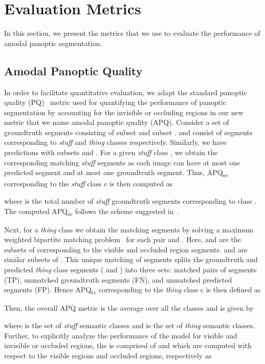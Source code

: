 \documentclass[10pt,twocolumn,letterpaper]{article}
\begin{document}
\section{Evaluation Metrics}
In this section, we present the metrics that we use to evaluate the performance of amodal panoptic segmentation. 

\subsection{Amodal Panoptic Quality}

In order to facilitate quantitative evaluation, we adapt the standard panoptic quality (PQ)~\cite{kirillov2019panoptic} metric used for quantifying the performance of panoptic segmentation by accounting for the invisible or occluding regions in our new metric that we name amodal panoptic quality (APQ). Consider a set of groundtruth segments consisting of subset  and subset .  and  consist of segments corresponding to \textit{stuff} and \textit{thing} classes respectively. Similarly, we have predictions with subsets  and . For a given \textit{stuff} class , we obtain the corresponding matching \textit{stuff} segments  as each image can have at most one predicted segment and at most one groundtruth segment. Thus, APQ\textsubscript{sc} corresponding to the \textit{stuff} class c is then computed as

where  is the total number of \textit{stuff} groundtruth segments corresponding to class . The computed APQ\textsubscript{sc} follows the scheme suggested in~\cite{porzi2019seamless}.

Next, for a \textit{thing} class  we obtain the matching segments by solving a maximum weighted bipartite matching problem~\cite{west2001introduction} for each pair   and . Here,   and  are the subsets of  corresponding to the visible and occluded region segments.  and  are similar subsets of . This unique matching of segments splits the groundtruth and predicted \textit{thing} class segments ( and ) into three sets: matched pairs of segments (TP), unmatched groundtruth segments (FN), and unmatched predicted segments (FP). Hence APQ\textsubscript{tc} corresponding to the \textit{thing} class c is then defined as

Then, the overall APQ metric is the average over all the classes and is given by

where  is the set of \textit{stuff} semantic classes and  is the set of \textit{thing} semantic classes. Further, to explicitly analyze the performance of the model for visible and invisible or occluded regions, the  is comprised of  and  which are computed with respect to the visible regions and occluded regions, respectively as
\end{document}
